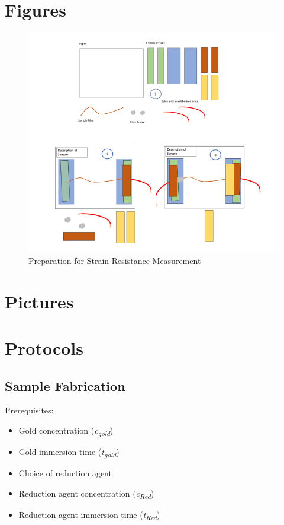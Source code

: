 \begin{appendices}
\label{sec:Appendix}



\section{Figures}
\label{appendix:fig}

\begin{figure}[hb!]
    \centering
    \includegraphics[width=.8\textwidth]{./pic/Meas_Prep_Together.PNG}
    \caption{Preparation for 
Strain-Resistance-Measurement}
    \label{fig:MeasPrep}
\end{figure}

\section{Pictures}


\section{Protocols}
\label{App:Protocols}

\subsection{Sample Fabrication}

Prerequisites: \hfill\newline

\begin{multicols}{2}
	\begin{itemize}
		\item Gold concentration (\textit{c\textsubscript{gold}})
		\item Gold immersion time (\textit{t\textsubscript{gold}})
		\item Choice of reduction agent
		\item Reduction agent concentration (\textit{c\textsubscript{Red}})
		\item Reduction agent immersion time (\textit{t\textsubscript{Red}})
	\end{itemize}
\end{multicols}


\end{appendices}
